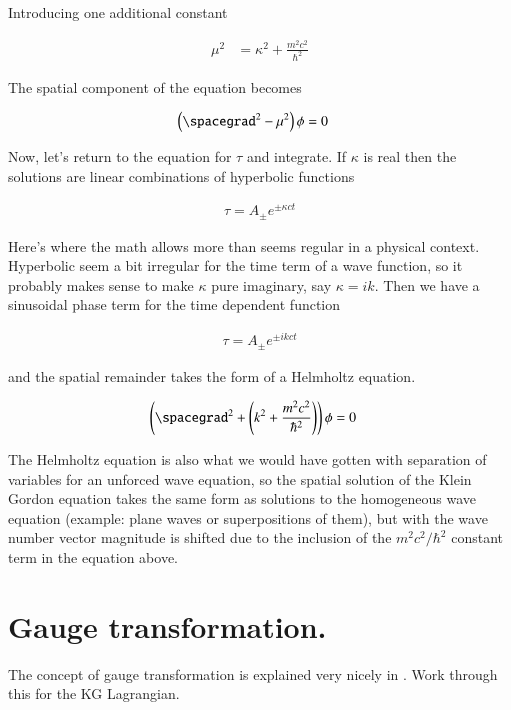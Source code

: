 Introducing one additional constant

\begin{align*}
\mu^2 &= \kappa^2 + \frac{m^2 c^2}{\hbar^2}
\end{align*}

The spatial component of the equation becomes

\begin{align*}
\left( \spacegrad^2 - \mu^2 \right) \phi &= 0
\end{align*}

Now, let's return to the equation for $\tau$ and integrate.  If $\kappa$ is real then the solutions are linear
combinations of hyperbolic functions

\begin{align*}
\tau = A_{\pm} e^{\pm \kappa c t}
\end{align*}

Here's where the math allows more than seems regular in a physical context.  Hyperbolic seem a bit irregular for the time term of a wave function, so it probably makes sense to make $\kappa$
pure imaginary, say $\kappa = i k$.  Then we have a sinusoidal phase term for the time dependent function

\begin{align*}
\tau = A_{\pm} e^{\pm i k c t}
\end{align*}

and the spatial remainder takes the form of a Helmholtz equation.

\begin{align*}
\left( \spacegrad^2 + \left( k^2 + \frac{m^2 c^2}{\hbar^2} \right) \right) \phi &= 0
\end{align*}

The Helmholtz equation is also what we would have gotten with separation of variables for an unforced wave
equation, so the spatial solution of the Klein Gordon equation takes the same form as solutions to the
homogeneous wave equation (example: plane waves or superpositions of them), but with the wave number vector magnitude is shifted due to the inclusion of
the $m^2 c^2/\hbar^2$ constant term in the equation above.

\section{Gauge transformation. }

The concept of gauge transformation is explained very nicely in \citep{vtgauge}.  Work through this
for the KG Lagrangian.

